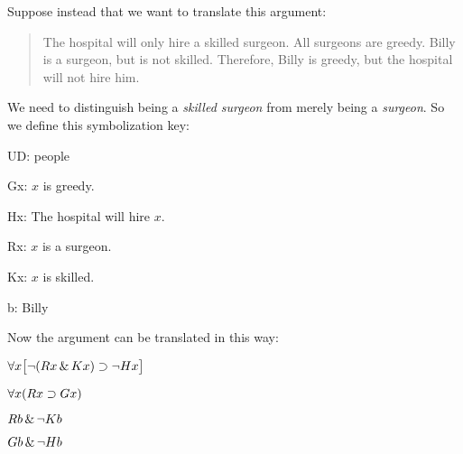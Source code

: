 Suppose instead that we want to translate this argument:
\begin{quote}
The hospital will only hire a skilled surgeon. All surgeons are greedy. Billy is a surgeon, but is not skilled. Therefore, Billy is greedy, but the hospital will not hire him.
\end{quote}
We need to distinguish being a \emph{skilled surgeon} from merely being a \emph{surgeon}. So we define this symbolization key:
\begin{ekey}
\item[UD:] people
\item[Gx:] $x$ is greedy.
\item[Hx:] The hospital will hire $x$.
\item[Rx:] $x$ is a surgeon.
\item[Kx:] $x$ is skilled.
\item[b:] Billy
\end{ekey}

Now the argument can be translated in this way:
\begin{earg}
\label{surgeon2}
\item[] $\forall x\bigl[\neg (Rx \,\&\, Kx) \supset \neg Hx\bigr]$
\item[] $\forall x(Rx \supset Gx)$
\item[] $Rb \,\&\, \neg Kb$
\item[\therefore] $Gb \,\&\, \neg Hb$
\end{earg}

